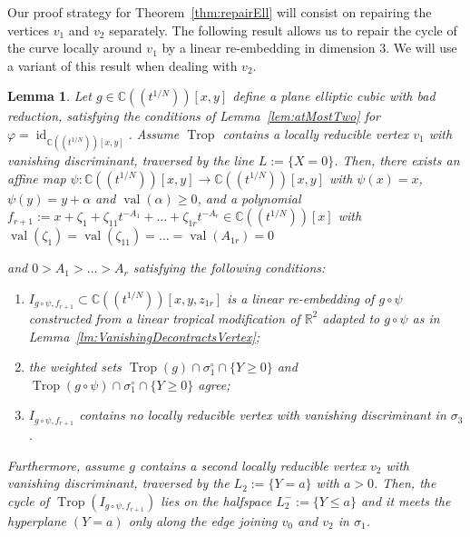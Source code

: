 \documentclass[11pt]{amsart}
\numberwithin{equation}{section}
\theoremstyle{plain}
\newtheorem{lemma}[theorem]{Lemma}
\theoremstyle{definition}
\theoremstyle{remark}
\begin{document}
Our proof strategy for Theorem~\ref{thm:repairEll} will consist on
repairing the vertices $v_1$ and $v_2$ separately. The following
result allows us to repair the cycle of the curve locally around $v_1$
by a linear re-embedding in dimension 3. We will use a variant of this
result when dealing with $v_2$.
\begin{lemma}\label{lm:repairV_1InDim3}
  Let $g\in {{\mathbb{C}}(\!(t^{1/N})\!)}[x,y]$ define a plane elliptic cubic with bad
  reduction, satisfying the conditions of Lemma~\ref{lem:atMostTwo}
  for $\varphi=\operatorname{id}_{{{\mathbb{C}}(\!(t^{1/N})\!)}[x,y]}$. Assume $\operatorname{Trop}$ contains a locally
  reducible vertex $v_1$ with vanishing discriminant, traversed by the
  line $L:=\{X=0\}$. Then, there exists an affine map $\psi\colon
  {{\mathbb{C}}(\!(t^{1/N})\!)}[x,y]\to {{\mathbb{C}}(\!(t^{1/N})\!)}[x,y]$ with $\psi(x)=x$, $\psi(y)=y+\alpha$ and
  $\operatorname{val}(\alpha)\geq 0$, and a polynomial $f_{r+1}:=x+{\zeta}_1 + {\zeta}_{11}
  t^{-A_1}+\ldots + {\zeta}_{1r}t^{-A_r}\in {{\mathbb{C}}(\!(t^{1/N})\!)}[x]$ with $\operatorname{val}({\zeta}_1)=\operatorname{val}({\zeta}_{11})=\ldots =\operatorname{val}(A_{1r})=0$ 
  
  and  $0>A_1>\ldots>A_r$
  satisfying the following conditions:
\begin{enumerate}[(1)]
\item $I_{g\circ \psi, f_{r+1}}\subset {{\mathbb{C}}(\!(t^{1/N})\!)}[x,y,z_{1r}]$ is a
  linear re-embedding of $g\circ \psi$ constructed from a linear
  tropical modification of ${\mathbb{R}}^2$ adapted to $g\circ \psi$ as in
  Lemma~\ref{lm:VanishingDecontractsVertex};
\item the weighted sets $\operatorname{Trop}(g)\cap \sigma_1^{\circ}\cap\{Y\geq 0\}$ and $\operatorname{Trop}(g\circ \psi)\cap \sigma_1^{\circ}\cap \{Y\geq 0\}$ agree;
\item $I_{g\circ \psi,f_{r+1}}$ contains no locally reducible
  vertex with vanishing discriminant in $\sigma_3$.
\end{enumerate}
Furthermore, assume $g$ contains a second locally reducible vertex
$v_2$ with vanishing discriminant, traversed by the $L_2:=\{Y=a\}$
with $a>0$. Then, the cycle of $\operatorname{Trop}(I_{g\circ \psi,f_{r+1}})$ lies
on the halfspace $L_2^-:=\{Y\leq a\}$ and it meets the hyperplane
$(Y=a)$ only along the edge joining $v_0$ and $v_2$ in $\sigma_1$.
\end{lemma}
\end{document}

